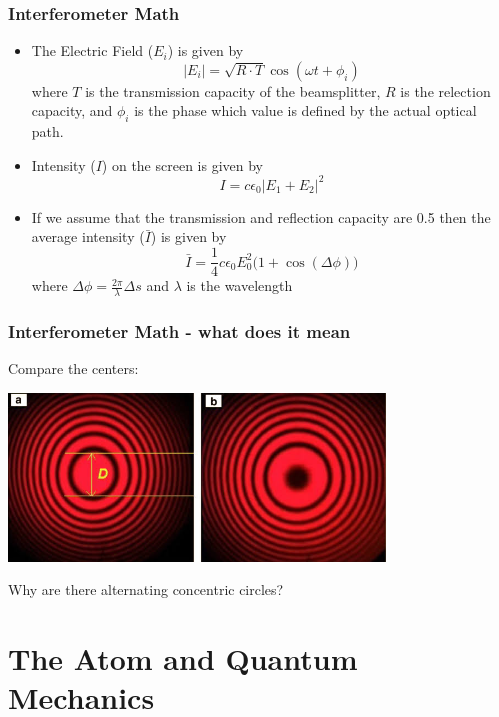 \documentclass{beamer}
\begin{document}
\begin{frame}\frametitle{Interferometer Math}
\begin{itemize}
\item The Electric Field ($E_i$) is given by
\begin{equation}
\vert E_i \vert = \sqrt{R \cdot T} \cos{(\omega t + \phi_i)}
\end{equation}
where $T$ is the transmission capacity of the beamsplitter, $R$ is the relection capacity, and $\phi_i$ is the phase which value is defined by the actual optical path.
\item Intensity ($I$) on the screen is given by
\begin{equation}
I = c \epsilon_0 \vert E_1 + E_2 \vert^2
\end{equation}
\item If we assume that the transmission and reflection capacity are 0.5 then the average intensity ($\bar{I}$) is given by
\begin{equation}
\bar{I} = \frac{1}{4} c \epsilon_0 E_0^2 (1 + \cos{(\Delta \phi))}
\end{equation}
where $\Delta \phi = \frac{2 \pi}{\lambda} \Delta s$ and $\lambda$ is the wavelength
\end{itemize}
\end{frame}

\begin{frame}\frametitle{Interferometer Math - what does it mean}
Compare the centers:

\begin{center}
\includegraphics[width=10cm]{fig/fringe2.jpeg}
\end{center}

Why are there alternating concentric circles?
\end{frame}


\section{The Atom and Quantum Mechanics}
\end{document}
